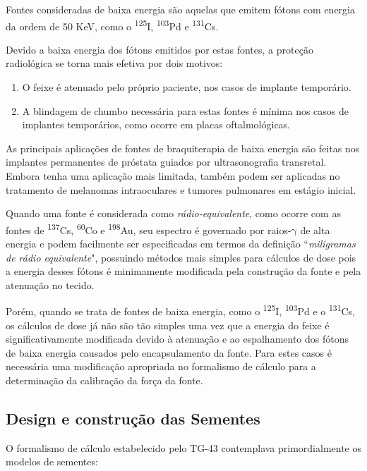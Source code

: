 \documentclass[11pt,a4paper]{article}
\begin{document}
		Fontes consideradas de baixa energia são aquelas que emitem fótons com energia da ordem de 50 KeV, como o \textsuperscript{125}I, \textsuperscript{103}Pd e \textsuperscript{131}Cs.

		Devido a baixa energia dos fótons emitidos por estas fontes, a proteção radiológica se torna mais efetiva por dois motivos:

			\begin{enumerate}
				\item O feixe é atenuado pelo próprio paciente, nos casos de implante temporário.
				\item A blindagem de chumbo necessária para estas fontes é mínima nos casos de implantes temporários, como ocorre em placas oftalmológicas.
			\end{enumerate}
		
		As principais aplicações de fontes de braquiterapia de baixa energia são feitas nos implantes permanentes de próstata guiados por ultrasonografia transretal. Embora tenha uma aplicação mais limitada, também podem ser aplicadas no tratamento de melanomas intraoculares e tumores pulmonares em estágio inicial.

		Quando uma fonte é considerada como \textit{\textcolor{CarnationPink}{rádio-equivalente}}, como ocorre com as fontes de \textsuperscript{137}Cs, \textsuperscript{60}Co e \textsuperscript{198}Au, seu espectro é governado por raios-$\mathrm{\gamma}$ de alta energia e podem facilmente ser especificadas em termos da definição ``\textit{miligramas de rádio equivalente}", possuindo métodos mais simples para cálculos de dose pois a energia desses fótons é minimamente modificada pela construção da fonte e pela atenuação no tecido. 

		Porém, quando se trata de fontes de baixa energia, como o \textsuperscript{125}I, \textsuperscript{103}Pd e o \textsuperscript{131}Cs, os cálculos de dose já não são tão simples uma vez que a energia do feixe é significativamente modificada devido à atenuação e ao espalhamento dos fótons de baixa energia causados pelo encapsulamento da fonte. Para estes casos é necessária uma modificação apropriada no formalismo de cálculo para a determinação da calibração da força da fonte.

		\subsection{Design e construção das Sementes}

			O formalismo de cálculo estabelecido pelo TG-43 contemplava primordialmente os modelos de sementes:
\end{document}
